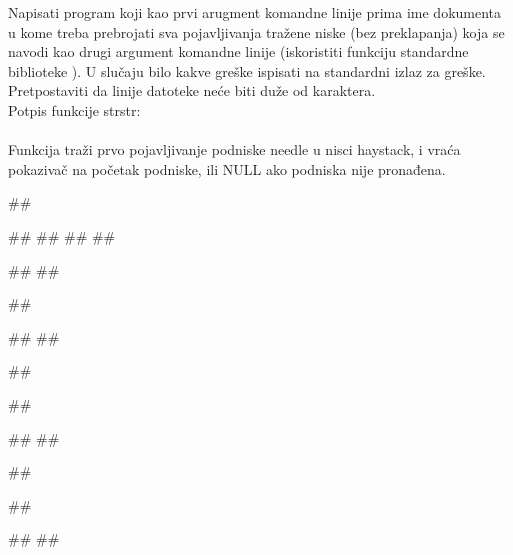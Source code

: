 \begin{Exercise}[label=904]
Napisati program koji kao prvi arugment komandne linije prima ime dokumenta u kome treba prebrojati sva pojavljivanja tražene niske (bez preklapanja) koja se navodi kao drugi argument komandne linije (iskoristiti funkciju standardne biblioteke ). U slučaju
bilo kakve greške ispisati  na standardni izlaz za greške.
Pretpostaviti da linije datoteke neće biti duže od 
karaktera.\\
Potpis funkcije strstr:\\
\\
Funkcija traži prvo pojavljivanje podniske needle u nisci
haystack, i vraća pokazivač na početak podniske, ili
NULL ako podniska nije pronađena.

\begin{miditest}
\begin{upotreba}{1}
##

##
##
##
##

#\naslovInt#
##
\end{upotreba}
\end{miditest}
\begin{miditest}
\begin{upotreba}{2}
##

#\naslovInt#
##
\end{upotreba}
\end{miditest}

\begin{miditest}
\begin{upotreba}{3}
##

##

#\naslovInt#
##
\end{upotreba}
\end{miditest}
\begin{miditest}
\begin{upotreba}{4}
##

##

#\naslovInt#
##
\end{upotreba}
\end{miditest}

\end{Exercise}
\begin{Answer}[ref=904]
\end{Answer}


